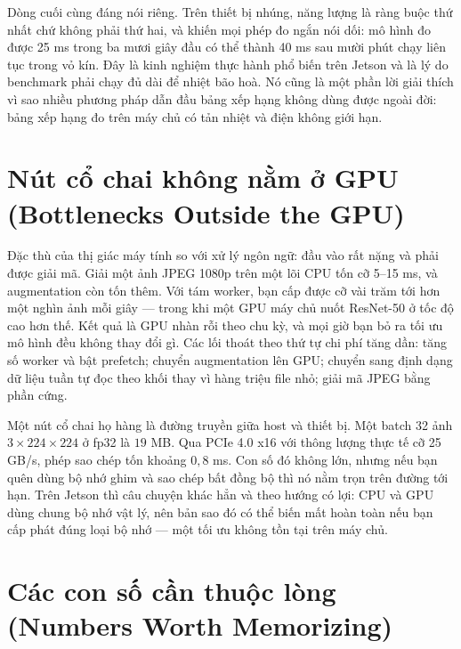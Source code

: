 \documentclass[../../deep_learning.tex]{subfiles}
\begin{document}
Dòng cuối cùng đáng nói riêng. Trên thiết bị nhúng, năng lượng là ràng buộc thứ nhất chứ không phải thứ hai, và  khiến mọi phép đo ngắn nói dối: mô hình đo được 25 ms trong ba mươi giây đầu có thể thành 40 ms sau mười phút chạy liên tục trong vỏ kín. Đây là kinh nghiệm thực hành phổ biến trên Jetson và là lý do benchmark phải chạy đủ dài để nhiệt bão hoà.
 Nó cũng là một phần lời giải thích vì sao nhiều phương pháp dẫn đầu bảng xếp hạng không dùng được ngoài đời: bảng xếp hạng đo trên máy chủ có tản nhiệt và điện không giới hạn.

\section{Nút cổ chai không nằm ở GPU (Bottlenecks Outside the GPU)}

Đặc thù của thị giác máy tính so với xử lý ngôn ngữ: đầu vào rất nặng và phải được giải mã. Giải một ảnh JPEG 1080p trên một lõi CPU tốn cỡ 5--15 ms, và augmentation còn tốn thêm. Với tám worker, bạn cấp được cỡ vài trăm tới hơn một nghìn ảnh mỗi giây --- trong khi một GPU máy chủ nuốt ResNet-50 ở tốc độ cao hơn thế. Kết quả là GPU nhàn rỗi theo chu kỳ, và mọi giờ bạn bỏ ra tối ưu mô hình đều không thay đổi gì. Các lối thoát theo thứ tự chi phí tăng dần: tăng số worker và bật prefetch; chuyển augmentation lên GPU; chuyển sang định dạng dữ liệu tuần tự đọc theo khối thay vì hàng triệu file nhỏ; giải mã JPEG bằng phần cứng.

Một nút cổ chai họ hàng là đường truyền giữa host và thiết bị. Một batch 32 ảnh \(3\times224\times224\) ở fp32 là \(19\) MB. Qua PCIe 4.0 x16 với thông lượng thực tế cỡ 25 GB/s, phép sao chép tốn khoảng \(0{,}8\) ms. Con số đó không lớn, nhưng nếu bạn quên dùng bộ nhớ ghim và sao chép bất đồng bộ thì nó nằm trọn trên đường tới hạn. Trên Jetson thì câu chuyện khác hẳn và theo hướng có lợi: CPU và GPU dùng chung bộ nhớ vật lý, nên bản sao đó có thể biến mất hoàn toàn nếu bạn cấp phát đúng loại bộ nhớ --- một tối ưu không tồn tại trên máy chủ.

\section{Các con số cần thuộc lòng (Numbers Worth Memorizing)}
\end{document}
